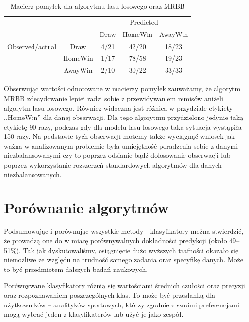 \begin{center}
\begin{table}[H]
\renewcommand{\arraystretch}{1.5}
\caption{Macierz pomyłek dla algorytmu lasu losowego oraz MRBB}
\begin{center}
\begin{tabular}{|c|c|c|c|c|}
   \cline{3-5} 
   \multicolumn{1}{c}{} & & \multicolumn{3}{c|}{Predicted} \\ \cline{3-5}
   \multicolumn{1}{c}{} & & Draw & HomeWin & AwayWin \\ \hline
   
   {Observed/actual}
   & Draw & 4/21 & 42/20 & 18/23 \\ \cline{2-5}
   & HomeWin & 1/17 & 78/58 & 19/23  \\ \cline{2-5}
   & AwayWin & 2/10 & 30/22 & 33/33 \\ \hline
\end{tabular}
\end{center}
\end{table}
\end{center}

Obserwując wartości odnotowane w macierzy pomyłek zauważamy, że algorytm MRBB zdecydowanie lepiej radzi sobie z przewidywaniem remisów aniżeli algorytm lasu losowego. Również widoczna jest różnica w przydziale etykiety ,,HomeWin'' dla danej obserwacji. Dla tego algorytmu przydzielono jedynie taką etykietę 90 razy, podczas gdy dla modelu lasu losowego taka sytuacja wystąpiła 150 razy. Na podstawie tych obserwacji możemy także wyciągnąć wniosek jak ważna w analizowanym problemie była umiejętność poradzenia sobie z danymi niezbalansowanymi czy to poprzez odsianie bądź dolosowanie obserwacji lub poprzez wykorzystanie rozszerzeń standardowych algorytmów dla danych niezbalansowanych.

\section{Porównanie algorytmów}

\noindent Podsumowując i porównując wszystkie metody - klasyfikatory można stwierdzić, że prowadzą one do w miarę porównywalnych dokładności predykcji (około 49--51\%). Tak jak dyskutowaliśmy, osiągnięcie dużo wyższych trafności okazało się niemożliwe ze względu na trudność samego zadania oraz specyfikę danych. Może to być przedmiotem dalszych badań naukowych. 

Porównywane klasyfikatory różnią się wartościami średnich czułości oraz precyzji oraz rozpoznawaniem poszczególnych klas. To może być przesłanką dla użytkowników -- analityków sportowych, którzy zgodnie z swoimi preferencjami mogą wybrać jeden z klasyfikatorów lub użyć je jako zespół. 

